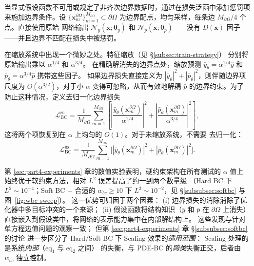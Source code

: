 \documentclass{xmu}
\theoremstyle{plain}
\theoremstyle{remark}
\begin{document}
\label{subsubsec:soft-bc}
当显式假设函数不可用或规定了非齐次边界数据时，通过在损失泛函中添加惩罚项
来施加边界条件。设 $\{\mathbf{x}_m^{\partial\Omega}\}_{m=1}^{M_{\partial\Omega}}\subset\partial\Omega$
为边界配点，均匀采样，每条边 $M_{\partial\Omega}/4$ 个点。直接使用原始
网络输出 $\mathcal{N}_y(\mathbf{x};\boldsymbol{\theta}_y)$ 和
$\mathcal{N}_p(\mathbf{x};\boldsymbol{\theta}_p)$——没有 $D(\mathbf{x})$ 因子
——并且边界不匹配在损失中被惩罚。

在缩放系统中出现一个微妙之处。特征缩放（见 §\ref{subsec:train-strategy}）
分别将原始输出乘以 $\alpha^{1/4}$ 和 $\alpha^{3/4}$。
在精确解消失的边界点处，缩放预测 $\bar y_\theta=\alpha^{1/4}\hat y$ 和
$\bar p_\theta=\alpha^{3/4}\hat p$ 携带这些因子。
如果边界损失直接定义为 $|\bar y_\theta|^2+|\bar p_\theta|^2$，则伴随边界项
尺度为 $O(\alpha^{3/2})$，对于小 $\alpha$ 变得可忽略，从而有效地解耦
$\bar p$ 的边界约束。为了防止这种情况，定义去归一化边界损失
\begin{equation}
\mathcal{L}_{\mathrm{BC}}^{\mathrm{sc}}
= \frac{1}{M_{\partial\Omega}}\sum_{m=1}^{M_{\partial\Omega}}\left[
\left|\frac{\bar y_\theta(\mathbf{x}_m^{\partial\Omega})}{\alpha^{1/4}}\right|^2
+ \left|\frac{\bar p_\theta(\mathbf{x}_m^{\partial\Omega})}{\alpha^{3/4}}\right|^2\right],
\label{eq:bc-loss-sc}
\end{equation}
这将两个项恢复到在 $\alpha$ 上均匀的 $O(1)$。对于未缩放系统，不需要
去归一化：
\begin{equation}
\mathcal{L}_{\mathrm{BC}}^{\mathrm{us}}
= \frac{1}{M_{\partial\Omega}}\sum_{m=1}^{M_{\partial\Omega}}
\bigl[|\bar y_\theta(\mathbf{x}_m^{\partial\Omega})|^2+|\bar p_\theta(\mathbf{x}_m^{\partial\Omega})|^2\bigr].
\label{eq:bc-loss-us}
\end{equation}

\label{subsubsec:bc-comparison}
第 \ref{sec:part4-experiments} 章的数值实验表明，硬约束架构在所有测试的
$\alpha$ 值上始终优于软约束方法，相对 $L^2$ 误差提高了约一到两个数量级
（Hard BC 下 $L^2\sim 10^{-4}$；Soft BC + 合适的 $w_{bc}\ge 10$ 下
$L^2\sim 10^{-2}$，见 §\ref{subsubsec:softbc} 与图~\ref{fig:wbc-sweep}）。
这一优势可归因于两个因素：
(i) 边界损失的消除消除了优化器中多目标冲突的一个来源；
(ii) 假设函数将结构知识（$\bar y$ 和 $\bar p$ 在 $\partial\Omega$ 上消失）
直接嵌入到假设类中，将网络的表示能力集中在内部解结构上。
这些发现与\cite{24}针对单方程边值问题的观察一致；
但第 \ref{sec:part4-experiments} 章 §\ref{subsubsec:softbc} 的讨论
进一步区分了 Hard/Soft BC 下 Scaling 效果的\emph{适用范围}：
Scaling 处理的是系统\emph{内部}（$\mathrm{eq}_1$ 与 $\mathrm{eq}_2$ 之间）
的失衡，与 PDE-BC 的\emph{跨类}失衡正交，后者由 $w_{bc}$ 独立控制。
\end{document}
